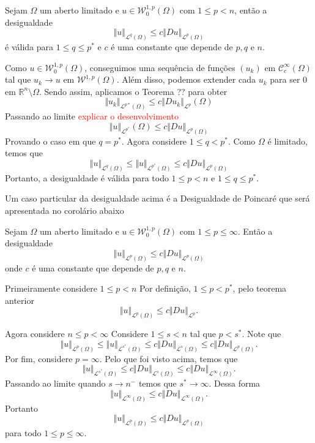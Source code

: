 \documentclass[a4paper, 11pt]{book}
\theoremstyle{definition}
\newcommand{\bR}{\mathbb{R}}
\newcommand{\cC}{\mathcal{C}}
\newcommand{\cL}{\mathcal{L}}
\newcommand{\cW}{\mathcal{W}}
\begin{document}
\begin{tbox}
    Sejam $\Omega$ um aberto limitado e $u \in \cW^{1,p}_0(\Omega)$ com $1 \leqslant p < n$, então a desigualdade
    \[
        \Vert u \Vert_{\cL^q(\Omega)} \leqslant c \Vert Du \Vert_{\cL^p(\Omega)}
    \]
    é válida para $1 \leqslant q \leqslant p^*$ e $c$ é uma constante que depende de $p, q$ e $n$.
\end{tbox}
\begin{prf}
    Como $u \in \cW^{1,p}_0(\Omega)$, conseguimos uma sequência de funções $(u_k)$ em $\cC^{\infty}_c(\Omega)$ tal que $u_k \to u$ em $\cW^{1,p}(\Omega)$.
    Além disso, podemos extender cada $u_k$ para ser $0$ em $\bR^n \setminus \Omega$.
    Sendo assim, aplicamos o Teorema ?? para obter
    \[
        \Vert u_k \Vert_{\cL^{p*}(\Omega)} \leqslant c \Vert Du_k \Vert_{\cL^p}(\Omega)
    \]
    Passando ao limite \textcolor{red}{explicar o desenvolvimento}
    \[
        \Vert u \Vert_{\cL^{p^*}}(\Omega) \leqslant c \Vert Du \Vert_{\cL^p(\Omega)}
    \]
    Provando o caso em que $q = p^*$. Agora considere $1 \leqslant q < p^*$.
    Como $\Omega$ é limitado, temos que
    \[
        \Vert u \Vert_{\cL^q(\Omega)} \leqslant \Vert u \Vert_{\cL^{p^*}(\Omega)} \leqslant c \Vert Du \Vert_{\cL^p(\Omega)}
    \]
    Portanto, a desigualdade é válida para todo $1 \leqslant p < n$ e $1 \leqslant q \leqslant p^*$.
\end{prf}

Um caso particular da desigualdade acima é a Desigualdade de Poincaré que será apresentada no corolário abaixo

\begin{cbox}
   Sejam $\Omega$ um aberto limitado e $u \in \cW^{1,p}_0(\Omega)$ com $1 \leqslant p \leqslant \infty$. Então a desigualdade
   \[
        \Vert u \Vert_{\cL^p(\Omega)} \leqslant c\Vert Du \Vert_{\cL^p(\Omega)}
   \]
   onde $c$ é uma constante que depende de $p, q$ e $n$.
\end{cbox}
\begin{prf}
    Primeiramente considere $1 \leqslant p < n$
    Por definição, $1 \leqslant p < p^*$, pelo teorema anterior
    \[
        \Vert u \Vert_{\cL^p(\Omega)} \leqslant c \Vert Du \Vert_{\cL^p}.
    \]

    Agora considere $n \leqslant p < \infty$
    Considere $1 \leqslant s < n$ tal que $p < s^*$.
    Note que
    \[
        \Vert u \Vert_{\cL^p(\Omega)} \leqslant \Vert u \Vert_{\cL^{s^*}(\Omega)} \leqslant c \Vert Du \Vert_{\cL^s(\Omega)} \leqslant c \Vert Du \Vert_{\cL^p(\Omega)}.
    \]
    Por fim, considere $p = \infty$.
    Pelo que foi visto acima, temos que
    \[
        \Vert u \Vert_{\cL^{s^*}(\Omega)} \leqslant c \Vert Du \Vert_{\cL^{s}(\Omega)} \leqslant c \Vert Du \Vert_{\cL^\infty(\Omega)}.
    \]
    Passando ao limite quando $s \to n^-$ temos que $s^* \to \infty$. Dessa forma
    \[
        \Vert u \Vert_{\cL^\infty(\Omega)} \leqslant c \Vert Du \Vert_{\cL^\infty(\Omega)}.
    \]
    Portanto
    \[
        \Vert u \Vert_{\cL^p(\Omega)} \leqslant c\Vert Du \Vert_{\cL^p(\Omega)}
    \]
    para todo $1 \leqslant p \leqslant \infty$.
\end{prf}
\end{document}
